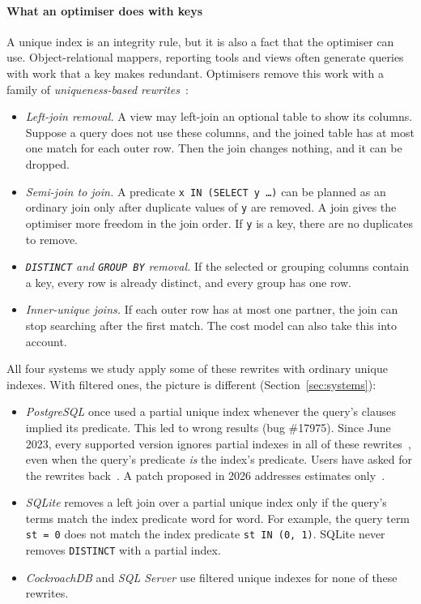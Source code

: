 \documentclass[conference]{IEEEtran}
\theoremstyle{definition}
\newcommand{\sql}[1]{\texttt{#1}}
\begin{document}
\paragraph*{What an optimiser does with keys} A unique index is an integrity rule, but it is also a fact that the
optimiser can use. Object-relational mappers, reporting tools and views often generate queries with work that a key
makes redundant. Optimisers remove this work with a family of \emph{uniqueness-based rewrites}~\cite{PL94,SSM96}:
\begin{itemize}
\item \emph{Left-join removal.} A view may left-join an optional table to show its columns. Suppose a query does not
  use these columns, and the joined table has at most one match for each outer row. Then the join changes nothing,
  and it can be dropped.
\item \emph{Semi-join to join.} A predicate \sql{x IN (SELECT y \ldots)} can be planned as an ordinary join only after
  duplicate values of \sql{y} are removed. A join gives the optimiser more freedom in the join order. If \sql{y} is a
  key, there are no duplicates to remove.
\item \emph{\sql{DISTINCT} and \sql{GROUP BY} removal.} If the selected or grouping columns contain a key, every row is
  already distinct, and every group has one row.
\item \emph{Inner-unique joins.} If each outer row has at most one partner, the join can stop searching after the first
  match. The cost model can also take this into account.
\end{itemize}
All four systems we study apply some of these rewrites with ordinary unique indexes. With filtered ones, the picture
is different (Section~\ref{sec:systems}):
\begin{itemize}
\item \emph{PostgreSQL} once used a partial unique index whenever the query's clauses implied its predicate. This
  led to wrong results (bug \#17975). Since June 2023, every supported version ignores partial indexes in all of
  these rewrites~\cite{PGBug17975}, even when the query's predicate \emph{is} the index's predicate. Users have asked
  for the rewrites back~\cite{Car19}. A patch proposed in 2026 addresses estimates only~\cite{Yan26}.
\item \emph{SQLite} removes a left join over a partial unique index only if the query's terms match the index predicate
  word for word. For example, the query term \sql{st = 0} does not match the index predicate \sql{st IN (0, 1)}. SQLite never removes \sql{DISTINCT}
  with a partial index.
\item \emph{CockroachDB} and \emph{SQL Server} use filtered unique indexes for none of these rewrites.
\end{itemize}
\end{document}
